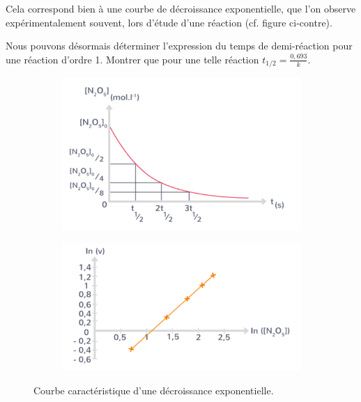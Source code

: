 \documentclass[11pt,a4paper]{article}
\begin{document}
Cela correspond bien à une courbe de décroissance exponentielle, que l'on observe expérimentalement souvent, lors d'étude d'une réaction (cf. figure ci-contre).

\endgroup

\begin{eg}
Nous pouvons désormais déterminer l'expression du temps de demi-réaction pour une réaction d'ordre 1. Montrer que pour une telle réaction $t_{1/2} =\frac{0,693}{k}$.
\vspace{3cm}
\end{eg}

\begin{figure}[ht]
\centering
\begin{subfigure}{.48\textwidth}
  \centering
  \includegraphics[width=.95\linewidth]{imgs/c4/5demitemps.png}  
\end{subfigure}
\begin{subfigure}{.48\textwidth}
  \centering
  \includegraphics[width=.95\linewidth]{imgs/c4/croitlogarithm.png}  
\end{subfigure}
\caption{Courbe caractéristique d'une décroissance exponentielle. }
\end{figure}
\end{document}
